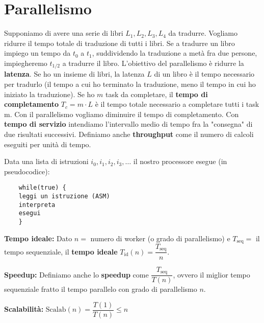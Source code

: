 

\section{Parallelismo}

\begin{defn}
	
	Supponiamo di avere una serie di libri $ L_1, L_2, L_3, L_4 $ da tradurre. Vogliamo ridurre il tempo totale di traduzione di tutti i libri. Se a tradurre un libro impiego un tempo da $ t_0 $ a $ t_1 $, suddividendo la traduzione a metà fra due persone, impiegheremo $ t_{1/2} $ a tradurre il libro. L'obiettivo del parallelismo è ridurre la \textbf{latenza}. Se ho un insieme di libri, la latenza $ L $ di un libro è il tempo necessario per tradurlo (il tempo a cui ho terminato la traduzione, meno il tempo in cui ho iniziato la traduzione). Se ho $ m $ task da completare, il \textbf{tempo di completamento}  $ T_c = m \cdot L$ è il tempo totale necessario a completare tutti i task m. Con il parallelismo vogliamo diminuire il tempo di completamento. Con \textbf{tempo di servizio} intendiamo l'intervallo medio di tempo fra la "consegna" di due risultati successivi. Definiamo anche \textbf{throughput} come il numero di calcoli eseguiti per unità di tempo.
	
	Data una lista di istruzioni $ i_0, i_1, i_2, i_3, \dots $ il nostro processore esegue (in pseudocodice):
	
	\begin{lstlisting}
	while(true) {
	leggi un istruzione (ASM)
	interpreta
	esegui
	}
	\end{lstlisting} 
\end{defn}


\begin{defn}
	\textbf{Tempo ideale:}
	Dato $ n = $ numero di worker (o grado di parallelismo) e $ T_{\text{seq}} = $ il tempo sequenziale, il \textbf{tempo ideale} $ T_{\text{id}}(n) = \dfrac{T_{\text{seq}}}{n}$.
\end{defn}


\begin{defn}
	\textbf{Speedup:}
	Definiamo anche lo \textbf{speedup} come $ \dfrac{T_{\text{seq}}}{T(n)} $, ovvero il miglior tempo sequenziale fratto il tempo parallelo con grado di parallelismo $ n $.
\end{defn}

\begin{defn}
	\textbf{Scalabilità:} $ \text{Scalab}(n) = \dfrac{T(1)}{T(n)} \leq n $
\end{defn}

